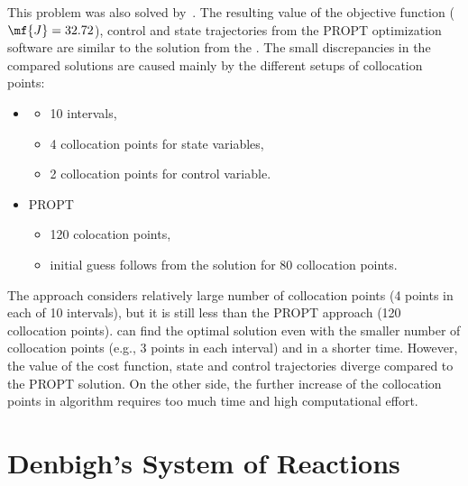 This problem was also solved by~\citep{rut10}. The resulting value of the objective function ($\mf{J}=32.72$), control and state trajectories from the PROPT optimization software are similar to the solution from the . The small discrepancies in the compared solutions are caused mainly by the different setups of collocation points:
\begin{itemize}
	\item {} 
	\begin{itemize}
		\item 10 intervals,
		\item 4 collocation points for state variables,
		\item 2 collocation points for control variable.
	\end{itemize}
	\item PROPT
	\begin{itemize}
		\item 120 colocation points,
		\item initial guess follows from the solution for 80 collocation points.
	\end{itemize}
\end{itemize}
The  approach considers relatively large number of collocation points (4 points in each of 10 intervals), but it is still less than the PROPT approach (120 collocation points).  can find the optimal solution even with the smaller number of collocation points (e.g., 3 points in each interval) and in a shorter time. However, the value of the cost function, state and control trajectories diverge compared to the PROPT solution. On the other side, the further increase of the collocation points in  algorithm requires too much time and high computational effort.

\section{Denbigh's System of Reactions}
\label{sec:dendae}

